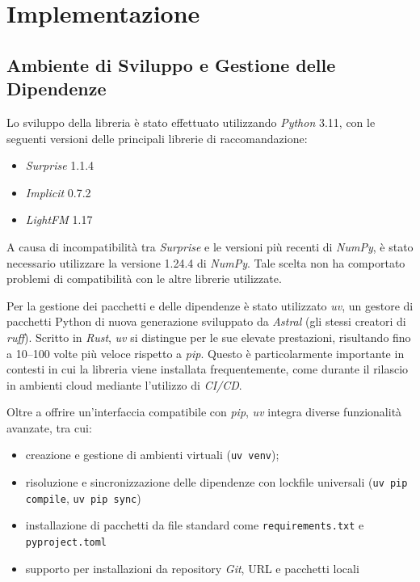 \chapter{Implementazione}

\section{Ambiente di Sviluppo e Gestione delle Dipendenze}

Lo sviluppo della libreria è stato effettuato utilizzando \textit{Python} 3.11, con le seguenti versioni delle principali librerie di raccomandazione:

\begin{itemize}
  \item \textit{Surprise} 1.1.4
  \item \textit{Implicit} 0.7.2
  \item \textit{LightFM} 1.17
\end{itemize}

A causa di incompatibilità tra \textit{Surprise} e le versioni più recenti di \textit{NumPy}, è stato necessario utilizzare la versione 1.24.4 di \textit{NumPy}. Tale scelta non ha comportato problemi di compatibilità con le altre librerie utilizzate.

Per la gestione dei pacchetti e delle dipendenze è stato utilizzato \textit{uv}, un gestore di pacchetti Python di nuova generazione sviluppato da \textit{Astral} (gli stessi creatori di \textit{ruff}). Scritto in \textit{Rust}, \textit{uv} si distingue per le sue elevate prestazioni, risultando fino a 10--100 volte più veloce rispetto a \textit{pip}. Questo è particolarmente importante in contesti in cui la libreria viene installata frequentemente, come durante il rilascio in ambienti cloud mediante l'utilizzo di \textit{CI/CD}.

Oltre a offrire un'interfaccia compatibile con \textit{pip}, \textit{uv} integra diverse funzionalità avanzate, tra cui:

\begin{itemize}
  \item creazione e gestione di ambienti virtuali (\texttt{uv venv});
  \item risoluzione e sincronizzazione delle dipendenze con lockfile universali (\texttt{uv pip compile}, \texttt{uv pip sync})
  \item installazione di pacchetti da file standard come \texttt{requirements.txt} e \\ \texttt{pyproject.toml}
  \item supporto per installazioni da repository \textit{Git}, URL e pacchetti locali
\end{itemize}

